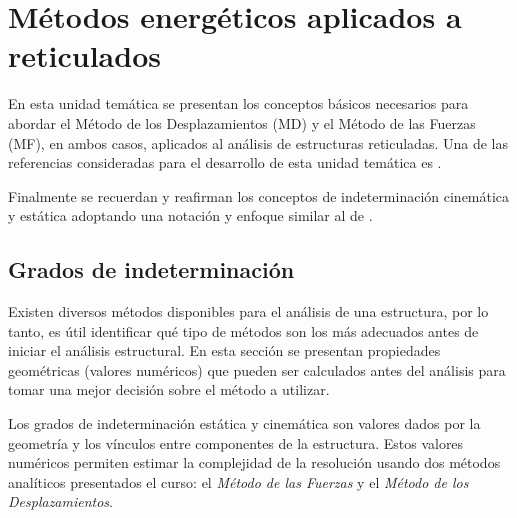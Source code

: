 %
%
%

\chapter[Métodos energéticos aplicados a reticulados]{Métodos energéticos aplicados a reticulados}

En esta unidad temática se presentan los conceptos básicos necesarios para abordar el Método de los Desplazamientos (MD) y el Método de las Fuerzas (MF), en ambos casos, aplicados al análisis de estructuras reticuladas. %
%
Una de las referencias consideradas para el desarrollo de esta unidad temática es \citep{Reddy2002b}. %





Finalmente se recuerdan y reafirman los conceptos de indeterminación cinemática y estática adoptando una notación y enfoque similar al de \citep{CerveraRuiz2002,CerveraRuiz2002ii}. %













\section{Grados de indeterminación}

Existen diversos métodos disponibles para el análisis de una estructura, por lo tanto, es útil identificar qué tipo de métodos son los más adecuados antes de iniciar el análisis estructural. %
En esta sección se presentan propiedades geométricas (valores numéricos) que pueden ser calculados antes del análisis para tomar una mejor decisión sobre el método a utilizar.

Los grados de indeterminación estática y cinemática son valores dados por la geometría y los vínculos entre componentes de la estructura. %
%
Estos valores numéricos permiten estimar la complejidad de la resolución usando dos métodos analíticos presentados el curso: el \textit{Método de las Fuerzas} y el \textit{Método de los Desplazamientos}. %
%


